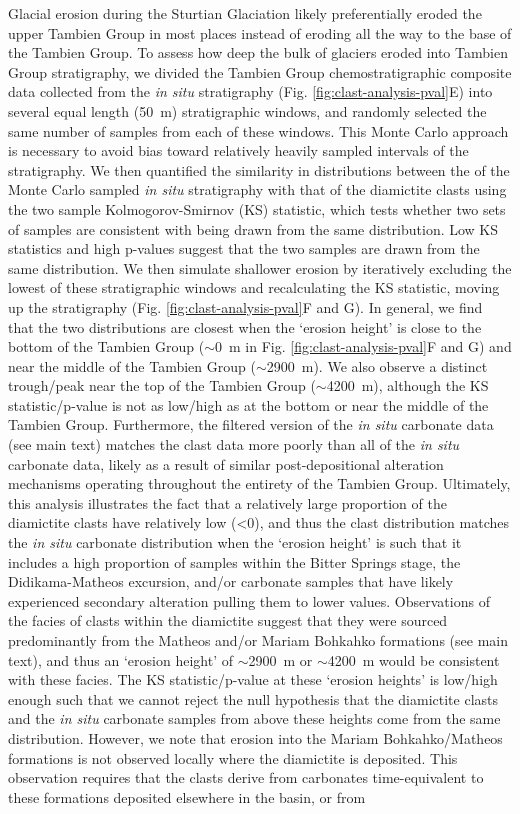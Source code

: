 Glacial erosion during the Sturtian Glaciation likely preferentially eroded the upper Tambien Group in most places instead of eroding all the way to the base of the Tambien Group. To assess how deep the bulk of glaciers eroded into Tambien Group stratigraphy, we divided the Tambien Group chemostratigraphic composite data collected from the \textit{in situ} stratigraphy (Fig. \ref{fig:clast-analysis-pval}E) into several equal length (50~m) stratigraphic windows, and randomly selected the same number of samples from each of these windows. This Monte Carlo approach is necessary to avoid bias toward relatively heavily sampled intervals of the stratigraphy. We then quantified the similarity in distributions between the \dC of the Monte Carlo sampled \textit{in situ} stratigraphy with that of the diamictite clasts using the two sample Kolmogorov-Smirnov (KS) statistic, which tests whether two sets of samples are consistent with being drawn from the same distribution. Low KS statistics and high p-values suggest that the two samples are drawn from the same distribution. We then simulate shallower erosion by iteratively excluding the lowest of these stratigraphic windows and recalculating the KS statistic, moving up the stratigraphy (Fig. \ref{fig:clast-analysis-pval}F and G). In general, we find that the two distributions are closest when the `erosion height' is close to the bottom of the Tambien Group ($\sim$0~m in Fig. \ref{fig:clast-analysis-pval}F and G) and near the middle of the Tambien Group ($\sim$2900~m). We also observe a distinct trough/peak near the top of the Tambien Group ($\sim$4200~m), although the KS statistic/p-value is not as low/high as at the bottom or near the middle of the Tambien Group. Furthermore, the filtered version of the \textit{in situ} carbonate \dC data (see main text) matches the clast data more poorly than all of the \textit{in situ} carbonate \dC data, likely as a result of similar post-depositional alteration mechanisms operating throughout the entirety of the Tambien Group. Ultimately, this analysis illustrates the fact that a relatively large proportion of the diamictite clasts have relatively low \dC (\textless0\permil), and thus the clast \dC distribution matches the \textit{in situ} carbonate \dC distribution when the `erosion height' is such that it includes a high proportion of samples within the Bitter Springs stage, the Didikama-Matheos excursion, and/or carbonate samples that have likely experienced secondary alteration pulling them to lower \dC values. Observations of the facies of clasts within the diamictite suggest that they were sourced predominantly from the Matheos and/or Mariam Bohkahko formations (see main text), and thus an `erosion height' of $\sim$2900~m or $\sim$4200~m would be consistent with these facies. The KS statistic/p-value at these `erosion heights' is low/high enough such that we cannot reject the null hypothesis that the diamictite clasts and the \textit{in situ} carbonate samples from above these heights come from the same distribution. However, we note that erosion into the Mariam Bohkahko/Matheos formations is not observed locally where the diamictite is deposited. This observation requires that the clasts derive from carbonates time-equivalent to these formations deposited elsewhere in the basin, or from 